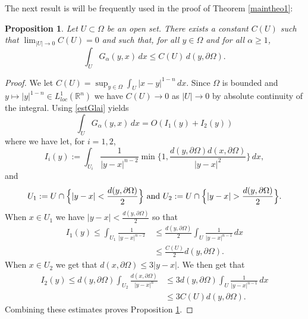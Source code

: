 \documentclass[10pt]{amsart}
\numberwithin{equation}{section}
\newcommand{\R}{\mathbb{R}}
\newcommand{\Om}{\Omega}
\def \bb{\hbox}
\theoremstyle{plain}
\newtheorem{prop}{Proposition}[section]%
\theoremstyle{remark}
\begin{document}
The next result is will be frequently used in the proof of Theorem \ref{maintheo1}:
\begin{prop}\label{lemme:estu0}
	Let $U \subset \Om$ be an open set. There exists a constant $C(U)$ such that $\lim_{|U| \to 0} C(U) = 0$ and such that, for all $y\in \Om$ and for all $\alpha \ge 1$,
	\begin{equation}\label{eq:estu0}
		\int_{U} G_{\alpha}(y,x)\, dx\leq C(U)\,  d(y,\partial\Om).
	\end{equation}
\end{prop}
\begin{proof}
We let $C(U) = \sup_{y \in \Om} \int_{U} |x-y|^{1-n} \, dx$. Since $\Om$ is bounded and $y \mapsto |y|^{1-n} \in L^{1}_{loc}(\R^n)$ we have $C(U) \to 0$ as $|U| \to 0$ by absolute continuity of the integral. Using \eqref{estGlai} yields
\begin{equation}\label{sumI1+I2}
	\int_{U} G_{\alpha}(y,x)\, dx= 
	O\left(  I_{1}(y)+I_{2}(y)\right) 
\end{equation}
where we have let, for $i=1,2$, 
\begin{equation*}
	I_i(y):= \int_{U_i}\frac{1}{|y-x|^{n-2}} \min\Big\{1,\frac{d(y,\partial\Om)d(x,\partial\Om)}{|y-x|^2}\Big\}\, dx,
\end{equation*}
and
\begin{eqnarray*}
	U_1:=U \cap \Big\{|y-x|<\frac{d(y,\partial\Om)}{2}\Big\} \bb{ and }U_2:=U \cap \Big\{|y-x|>\frac{d(y,\partial\Om)}{2}\Big\}.
\end{eqnarray*}
When $x \in U_1$ we have $|y-x|<\frac{d(y,\partial\Om)}{2}$ so that
\begin{equation*}
\begin{aligned}
I_1(y)\le\int_{U_1}\frac{1}{|y-x|^{n-2}}\, & \le \frac{d(y,\partial\Om)}{2}\int_{U}\frac{1}{|y-x|^{n-1}}\, dx \\
&  \le \frac{C(U)}{2} d(y, \partial \Om). 
\end{aligned}
\end{equation*}
When $x\in U_2$ we get that $d(x,\partial \Om) \leq 3|y-x|$.  We then get that 
\begin{equation*}
\begin{aligned}
I_2(y) \le d(y,\partial\Om)\int_{U_2} \frac{d(x,\partial\Om)}{|y-x|^{n}}
					& \le 3 d(y,\partial\Om) \int_{U}\frac{1}{|y-x|^{n-1}}\, dx \\
					& \le 3 C(U) d(y, \partial \Om). 
\end{aligned}
\end{equation*}
Combining these estimates proves Proposition \ref{lemme:estu0}.\end{proof}
\end{document}
